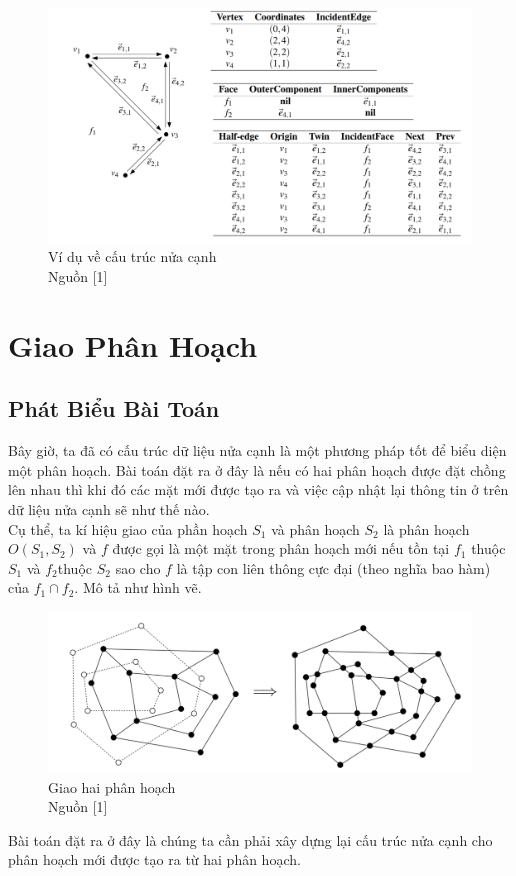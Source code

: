 \documentclass[15pt]{article}
\begin{document}
{\begin{itemize}
\end{itemize}
\begin{figure}[h!]
\centering
\includegraphics[scale=0.5]{./dcel2.png}
\caption{Ví dụ về cấu trúc nửa cạnh \\ Nguồn [1]}
\label{fig: ví dụ về cấu trúc nửa cạnh}
\end{figure}
\section{Giao Phân Hoạch}
\subsection{Phát Biểu Bài Toán}
Bây giờ, ta đã có cấu trúc dữ liệu nửa cạnh là một phương pháp tốt để biểu diện một phân hoạch. Bài toán đặt ra ở đây là nếu có hai phân hoạch được đặt chồng lên nhau thì khi đó các mặt mới được tạo ra và việc cập nhật lại thông tin ở trên dữ liệu nửa cạnh sẽ như thế nào. \\

Cụ thể, ta kí hiệu giao của phần hoạch $S_1$ và phân hoạch $S_2$ là phân hoạch $O(S_1, S_2)$ và $f$ được gọi là một mặt trong phân hoạch mới nếu tồn tại $f_1$ thuộc $S_1$ và $f_2$thuộc $S_2$ sao cho $f$ là tập con liên thông cực đại (theo nghĩa bao hàm) của $f_1 \cap f_2$. Mô tả như hình vẽ.\\

\begin{figure}[h!]
\centering
\includegraphics[scale=0.5]{./mapoverlay_example.png}
\caption{Giao hai phân hoạch \\ Nguồn [1]}
\label{fig: giao hai phân hoạch}
\end{figure}
Bài toán đặt ra ở đây là chúng ta cần phải xây dựng lại cấu trúc nửa cạnh cho phân hoạch mới được tạo ra từ hai phân hoạch.
}
\end{document}
